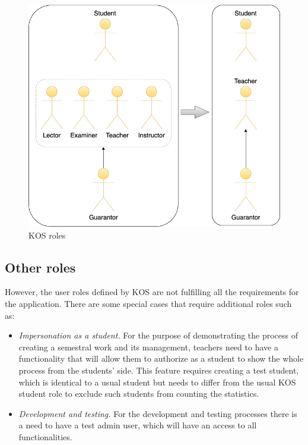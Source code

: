 \begin{figure}[h]
\centering
\includegraphics[scale=0.52]{../png/kos_roles.png}
\caption{KOS roles}\label{picture:kos_roles}
\end{figure}


\subsection{Other roles}

\noindent However, the user roles defined by KOS are not fulfilling all the requirements for the application. There are some special cases that require additional roles such as:

\begin{itemize}
    \item \emph{Impersonation as a student.} For the purpose of demonstrating the process of creating a semestral work and its management, teachers need to have a functionality that will allow them to authorize as a student to show the whole process from the students' side. This feature requires creating a test student, which is identical to a usual student but needs  to differ from the usual KOS student role to exclude such students from counting the statistics. 
    \item \emph{Development and testing.} For the development and testing processes there is a need to have a test admin user, which will have an access to all functionalities. 
\end{itemize}

